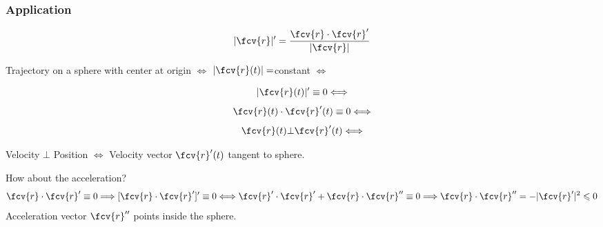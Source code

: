 \begin{frame}
  \frametitle{Application}
  $$|\fcv{r}|' = \frac{\fcv{r} \cdot \fcv{r}'}{|\fcv{r}|}$$

  Trajectory on a sphere with center at origin $\Longleftrightarrow$ $|\fcv{r}(t)| = $constant \pause $\Longleftrightarrow$

  $$|\fcv{r}(t)|'\equiv0 \Longleftrightarrow$$
  $$\fcv{r}(t)\cdot \fcv{r}'(t)\equiv 0 \Longleftrightarrow$$
  $$\fcv{r}(t) \bot \fcv{r}'(t) \Longleftrightarrow$$

  \pause Velocity  $\bot$ Position  $\Longleftrightarrow$ Velocity vector $\fcv{r}'(t)$ tangent to sphere.

  \bigskip

  How about the acceleration?\pause
  $$\fcv{r}\cdot \fcv{r}'\equiv 0 \Longrightarrow [\fcv{r}\cdot \fcv{r}']'\equiv 0 \Longleftrightarrow
  \fcv{r}'\cdot \fcv{r}'+\fcv{r}\cdot \fcv{r}'' \equiv 0 \Longrightarrow \fcv{r}\cdot \fcv{r}'' = -|\fcv{r}'|^2 \leqslant 0$$
  Acceleration vector $\fcv{r}''$ points inside the sphere.
\end{frame}